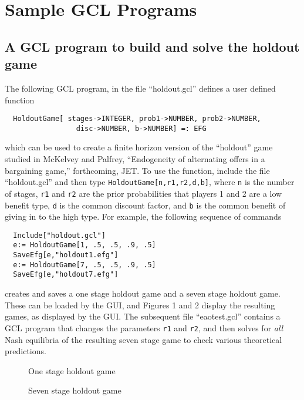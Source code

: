 \appendix
\chapter{Sample GCL Programs}
\pagestyle{headings}

\section{A GCL program to build and solve the holdout game}

The following GCL program, in the file ``holdout.gcl'' defines a user
defined function

\begin{verbatim}
  HoldoutGame[ stages->INTEGER, prob1->NUMBER, prob2->NUMBER, 
                 disc->NUMBER, b->NUMBER] =: EFG
\end{verbatim}

\noindent
which can be used to create a finite horizon version of the
``holdout'' game studied in McKelvey and Palfrey, ``Endogeneity of
alternating offers in a bargaining game,'' forthcoming, JET.  To use
the function, include the file ``holdout.gcl'' and then type
\verb+HoldoutGame[n,r1,r2,d,b]+, where \verb+n+ is the number of
stages, \verb+r1+ and \verb+r2+ are the prior probabilities that
players 1 and 2 are a low benefit type, \verb+d+ is the common
discount factor, and \verb+b+ is the common benefit of giving in to
the high type.  For example, the following sequence of commands

\begin{verbatim}
  Include["holdout.gcl"]
  e:= HoldoutGame[1, .5, .5, .9, .5]
  SaveEfg[e,"holdout1.efg"]
  e:= HoldoutGame[7, .5, .5, .9, .5]
  SaveEfg[e,"holdout7.efg"]
\end{verbatim}

\noindent
creates and saves a one stage holdout game and a seven stage holdout
game. These can be loaded by the GUI, and Figures 1 and 2 display the
resulting games, as displayed by the GUI.  The subsequent file
``eaotest.gcl'' contains a GCL program that changes the parameters
\verb+r1+ and \verb+r2+, and then solves for {\em all} Nash equilibria
of the resulting seven stage game to check various theoretical predictions.

\begin{figure}[htp]
\caption{One stage holdout game}
\end{figure}
\begin{figure}[htp]
\caption{Seven stage holdout game}
\end{figure}

